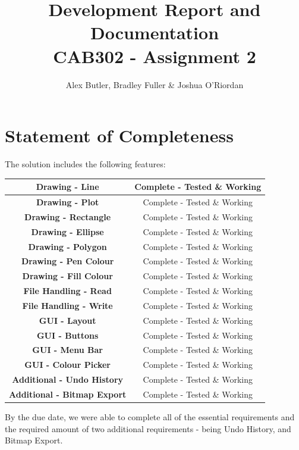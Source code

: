 \documentclass[12pt]{article} %
\begin{document}

\title{Development Report and Documentation
		 \\ \large CAB302 - Assignment 2}

\author {Alex Butler,  Bradley Fuller \& Joshua O'Riordan}
\maketitle

\newpage

\tableofcontents

\newpage

\section{Statement of Completeness}

The solution includes the following features: 
\begin{center}
	\begin{tabular}{|c|c|}
		\hline  \textbf{Drawing - Line} & Complete - Tested \& Working \\
		\hline  \textbf{Drawing - Plot} & Complete - Tested \& Working \\
		\hline  \textbf{Drawing - Rectangle} & Complete - Tested \& Working \\
		\hline  \textbf{Drawing - Ellipse} & Complete - Tested \& Working \\
		\hline  \textbf{Drawing - Polygon} & Complete - Tested \& Working \\
		\hline  \textbf{Drawing - Pen Colour} & Complete - Tested \& Working \\
		\hline  \textbf{Drawing - Fill Colour} & Complete - Tested \& Working \\
		\hline  \textbf{File Handling - Read} & Complete - Tested \& Working \\
		\hline  \textbf{File Handling - Write} & Complete - Tested \& Working \\
		\hline  \textbf{GUI - Layout} & Complete - Tested \& Working \\
		\hline  \textbf{GUI - Buttons} & Complete - Tested \& Working \\
		\hline  \textbf{GUI - Menu Bar} & Complete - Tested \& Working \\
		\hline  \textbf{GUI - Colour Picker} & Complete - Tested \& Working \\
		\hline  \textbf{Additional - Undo History} & Complete - Tested \& Working \\
		\hline  \textbf{Additional - Bitmap Export} & Complete - Tested \& Working \\
		\hline
	\end{tabular}
\end{center}
By the due date, we were able to complete all of the essential requirements and the required amount of two additional requirements - being Undo History, and Bitmap Export. 
\end{document}
